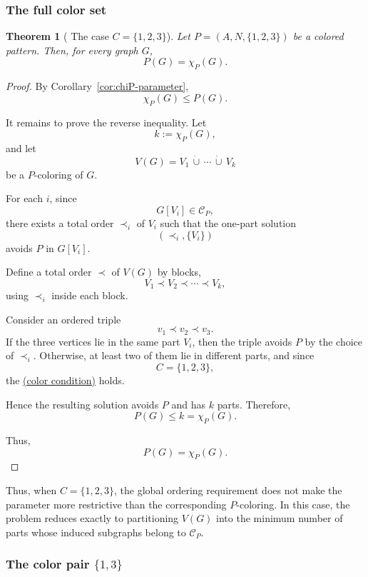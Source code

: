 \documentclass[12pt]{article}
\theoremstyle{plain}
\newtheorem{theorem}{Theorem}[section]
\theoremstyle{definition}
\theoremstyle{remark}
\theoremstyle{definition}
\newcommand{\colorcondition}{%
  \hyperref[def:avoid:cond:color]{(color condition)}\xspace
}
\begin{document}
\subsubsection{The full color set}
\label{subsubsec:full-color-set}



\begin{theorem}[
The case \texorpdfstring{\(C=\{1,2,3\}\)}{C=\{1,2,3\}}
]
\label{thm:full-color-set-equality}
Let
\(
P=(A,N,\{1,2,3\})
\)
be a colored pattern. Then, for every graph \(G\),
\[
P(G)=\chi_P(G).
\]
\end{theorem}

\begin{proof}
By Corollary~\ref{cor:chiP-parameter},
\[
\chi_P(G)\le P(G).
\]

It remains to prove the reverse inequality. Let
\[
k:=\chi_P(G),
\]
and let
\[
V(G)=V_1\,\dot\cup\,\cdots\,\dot\cup\,V_k
\]
be a \(P\)-coloring of \(G\).

For each \(i\), since
\[
G[V_i]\in\mathcal C_P,
\]
there exists a total order \(\prec_i\) of \(V_i\) such that the one-part
solution
\[
(\prec_i,\{V_i\})
\]
avoids \(P\) in \(G[V_i]\).

Define a total order \(\prec\) of \(V(G)\) by blocks,
\[
V_1\prec V_2\prec\cdots\prec V_k,
\]
using \(\prec_i\) inside each block.

Consider an ordered triple
\[
v_1\prec v_2\prec v_3.
\]
If the three vertices lie in the same part \(V_i\), then the triple avoids
\(P\) by the choice of \(\prec_i\). Otherwise, at least two of them lie in
different parts, and since
\[
C=\{1,2,3\},
\]
the \colorcondition{} holds.

Hence the resulting solution avoids \(P\) and has \(k\) parts. Therefore,
\[
P(G)\le k=\chi_P(G).
\]

Thus,
\[
P(G)=\chi_P(G).
\]
\end{proof}

Thus, when \(C=\{1,2,3\}\), the global ordering requirement does not make the parameter more restrictive than the corresponding \(P\)-coloring. In this case, the problem reduces exactly to partitioning \(V(G)\) into the minimum number of parts whose induced subgraphs belong to \(\mathcal C_P\).






\subsubsection{The color pair \texorpdfstring{\(\{1,3\}\)}{{1,3}}}
\label{subsubsec:color-pair-13}
\end{document}
